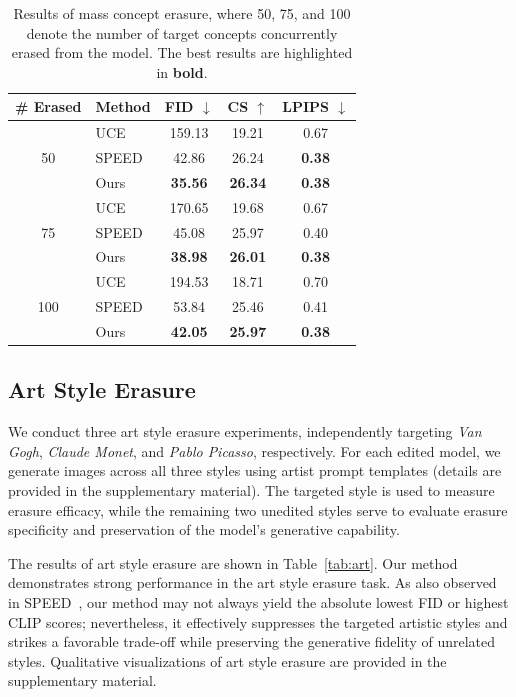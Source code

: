 \documentclass[letterpaper]{article} %
\begin{document}
\begin{table}[t]
\centering
\small
\setlength{\tabcolsep}{3pt}
\begin{tabular}{|c|l|ccc|}
\hline
\# Erased & Method & FID $\downarrow$ & CS $\uparrow$ & LPIPS $\downarrow$ \\ \hline
\multirow{3}{*}{50}
 & UCE   & 159.13 & 19.21 & 0.67 \\
 & SPEED & 42.86 & 26.24 & \textbf{0.38} \\
 & Ours  & \textbf{35.56} & \textbf{26.34} & \textbf{0.38} \\ \hline
\multirow{3}{*}{75}
 & UCE   & 170.65 & 19.68 & 0.67 \\
 & SPEED & 45.08 & 25.97 & 0.40 \\
 & Ours  & \textbf{38.98} & \textbf{26.01} & \textbf{0.38} \\ \hline
\multirow{3}{*}{100}
 & UCE   & 194.53 & 18.71 & 0.70 \\
 & SPEED & 53.84 & 25.46 & 0.41 \\
 & Ours  & \textbf{42.05} & \textbf{25.97} & \textbf{0.38} \\ \hline
\end{tabular}
\caption{Results of mass concept erasure, where 50, 75, and 100 denote the number of target concepts concurrently erased from the model. The best results are highlighted in \textbf{bold}.}
\label{tab:mass}
\end{table}




\subsection{Art Style Erasure}
We conduct three art style erasure experiments, independently targeting \textit{Van Gogh}, \textit{Claude Monet}, and \textit{Pablo Picasso}, respectively. For each edited model, we generate images across all three styles using artist prompt templates (details are provided in the supplementary material). The targeted style is used to measure erasure efficacy, while the remaining two unedited styles serve to evaluate erasure specificity and preservation of the model's generative capability.

The results of art style erasure are shown in Table~\ref{tab:art}. Our method demonstrates strong performance in the art style erasure task. As also observed in SPEED~\cite{SPEED}, our method may not always yield the absolute lowest FID or highest CLIP scores; nevertheless, it effectively suppresses the targeted artistic styles and strikes a favorable trade-off while preserving the generative fidelity of unrelated styles. Qualitative visualizations of art style erasure are provided in the supplementary material.
\end{document}
